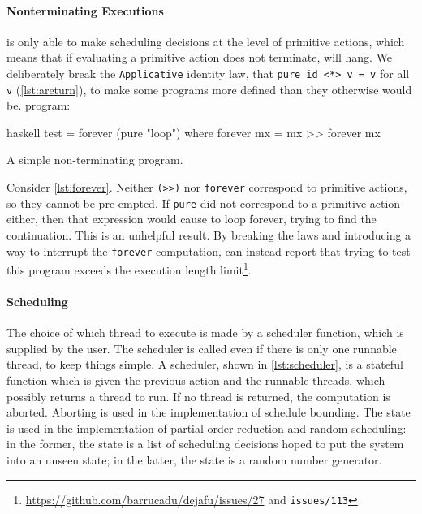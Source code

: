 \paragraph{Nonterminating Executions}
\dejafu{} is only able to make scheduling decisions at the level of
primitive actions, which means that if evaluating a primitive action
does not terminate, \dejafu{} will hang.  We deliberately break the
\verb|Applicative| identity law, that \verb|pure id <*> v = v| for all
\verb|v| (\cref{lst:areturn}), to make some programs more defined than
they otherwise would be.  program:

\begin{listing}
\centering
\begin{cminted}{haskell}
test = forever (pure "loop") where
  forever mx = mx >> forever mx
\end{cminted}
\caption{A simple non-terminating program.}\label{lst:forever}
\end{listing}

Consider \cref{lst:forever}.  Neither \verb|(>>)| nor \verb|forever|
correspond to primitive actions, so they cannot be pre-empted.  If
\verb|pure| did not correspond to a primitive action either, then that
expression would cause \dejafu{} to loop forever, trying to find the
continuation.  This is an unhelpful result.  By breaking the laws and
introducing a way to interrupt the \verb|forever| computation,
\dejafu{} can instead report that trying to test this program exceeds
the execution length
limit\footnote{\url{https://github.com/barrucadu/dejafu/issues/27} and \texttt{issues/113}}.

\paragraph{Scheduling}
The choice of which thread to execute is made by a scheduler function,
which is supplied by the user.  The scheduler is called even if there
is only one runnable thread, to keep things simple.  A scheduler,
shown in \cref{lst:scheduler}, is a stateful function which is given
the previous action and the runnable threads, which possibly returns a
thread to run.  If no thread is returned, the computation is aborted.
Aborting is used in the implementation of schedule bounding.  The
state is used in the implementation of partial-order reduction and
random scheduling: in the former, the state is a list of scheduling
decisions hoped to put the system into an unseen state; in the latter,
the state is a random number generator.

